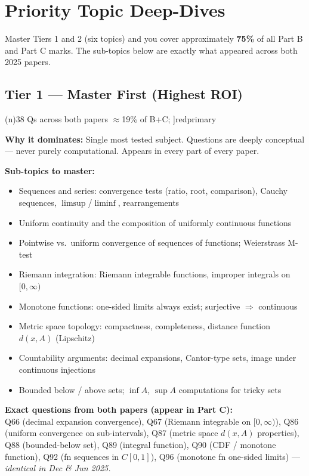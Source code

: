 \documentclass[12pt,a4paper]{article}
\newcommand{\badge}[2]{%
  \tikz[baseline=(n.base)]\node[fill=#1!20, draw=#1!60, text=#1!80!black,
    rounded corners=3pt, inner xsep=5pt, inner ysep=2pt,
    font=\tiny\bfseries](n){#2};%
}
\newcommand{\badgered}[1]{\badge{redprimary}{#1}}
\begin{document}
\newpage

\section{Priority Topic Deep-Dives}

\begin{alertred}
\small Master Tiers 1 and 2 (six topics) and you cover approximately \textbf{75\%} of all Part B and Part C marks. The sub-topics below are exactly what appeared across both 2025 papers.
\end{alertred}

\subsection{Tier 1 — Master First (Highest ROI)}

\begin{prioritybox}[1.\quad Real Analysis \hfill\badgered{38 Qs across both papers $\approx$19\% of B+C}]{redprimary}

\textbf{Why it dominates:} Single most tested subject. Questions are deeply conceptual — never purely computational. Appears in every part of every paper.

\medskip
\textbf{Sub-topics to master:}
\begin{itemize}[leftmargin=1.5em, itemsep=2pt]
  \item Sequences and series: convergence tests (ratio, root, comparison), Cauchy sequences, $\limsup$/$\liminf$, rearrangements
  \item Uniform continuity and the composition of uniformly continuous functions
  \item Pointwise vs.\ uniform convergence of sequences of functions; Weierstrass M-test
  \item Riemann integration: Riemann integrable functions, improper integrals on $[0,\infty)$
  \item Monotone functions: one-sided limits always exist; surjective $\Rightarrow$ continuous
  \item Metric space topology: compactness, completeness, distance function $d(x,A)$ (Lipschitz)
  \item Countability arguments: decimal expansions, Cantor-type sets, image under continuous injections
  \item Bounded below / above sets; $\inf A$, $\sup A$ computations for tricky sets
\end{itemize}

\medskip
\textbf{Exact questions from both papers (appear in Part C):}\\
\small Q66 (decimal expansion convergence), Q67 (Riemann integrable on $[0,\infty)$), Q86 (uniform convergence on sub-intervals), Q87 (metric space $d(x,A)$ properties), Q88 (bounded-below set), Q89 (integral function), Q90 (CDF / monotone function), Q92 (fn sequences in $C[0,1]$), Q96 (monotone fn one-sided limits) --- \textit{identical in Dec \& Jun 2025.}
\end{prioritybox}
\end{document}
